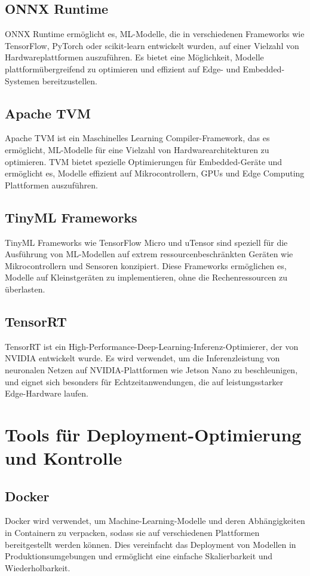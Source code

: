\subsection{ONNX Runtime}
ONNX Runtime ermöglicht es, ML-Modelle, die in verschiedenen Frameworks wie TensorFlow, PyTorch oder scikit-learn entwickelt wurden, 
auf einer Vielzahl von Hardwareplattformen auszuführen. Es bietet eine Möglichkeit, Modelle plattformübergreifend zu optimieren und effizient auf 
Edge- und Embedded-Systemen bereitzustellen.

\subsection{Apache TVM}
Apache TVM ist ein Maschinelles Learning Compiler-Framework, das es ermöglicht, ML-Modelle für eine Vielzahl von Hardwarearchitekturen zu optimieren. 
TVM bietet spezielle Optimierungen für Embedded-Geräte und ermöglicht es, Modelle effizient auf Mikrocontrollern, GPUs und Edge Computing Plattformen auszuführen.

\subsection{TinyML Frameworks}
TinyML Frameworks wie TensorFlow Micro und uTensor sind speziell für die Ausführung von ML-Modellen auf extrem ressourcenbeschränkten Geräten wie 
Mikrocontrollern und Sensoren konzipiert. Diese Frameworks ermöglichen es, Modelle auf Kleinstgeräten zu implementieren, ohne die Rechenressourcen zu überlasten.

\subsection{TensorRT}
TensorRT ist ein High-Performance-Deep-Learning-Inferenz-Optimierer, der von NVIDIA entwickelt wurde. Es wird verwendet, um die Inferenzleistung von 
neuronalen Netzen auf NVIDIA-Plattformen wie Jetson Nano zu beschleunigen, und eignet sich besonders für Echtzeitanwendungen, die auf leistungsstarker Edge-Hardware laufen.

\section{Tools für Deployment-Optimierung und Kontrolle}

\subsection{Docker}
Docker wird verwendet, um Machine-Learning-Modelle und deren Abhängigkeiten in Containern zu verpacken, sodass sie auf verschiedenen Plattformen 
bereitgestellt werden können. Dies vereinfacht das Deployment von Modellen in Produktionsumgebungen und ermöglicht eine einfache Skalierbarkeit und Wiederholbarkeit.

